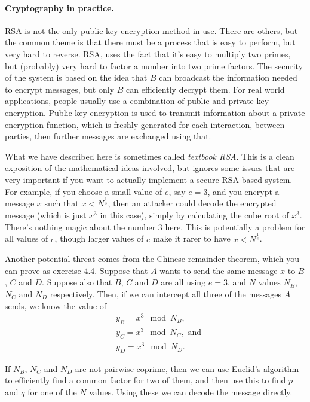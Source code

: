 \documentclass{article}
\theoremstyle{plain}
\begin{document}
\paragraph{Cryptography in practice.} 

RSA is not the only public key encryption method in use. There are others, but the common theme is that there must be a process that is easy to perform, but very hard to reverse. RSA, uses the fact that it's easy to multiply two primes, but (probably) very hard to factor a number into two prime factors. The security of the system is based on the idea that $B$ can broadcast the information needed to encrypt messages, but only $B$ can efficiently decrypt them. For real world applications, people usually use a combination of public and private key encryption. Public key encryption is used to transmit information about a private encryption function, which is freshly generated for each interaction, between parties, then further messages are exchanged using that.

What we have described here is sometimes called \emph{textbook RSA}. This is a clean exposition of the mathematical ideas involved, but ignores some issues that are very important if you want to actually implement a secure RSA based system. For example, if you choose a small value of $e$, say $e=3$, and you encrypt a message $x$ such that $x < N^{\frac{1}{3}}$, then an attacker could decode the encrypted message (which is just $x^3$ in this case), simply by calculating the cube root of $x^3$. There's nothing magic about the number $3$ here. This is potentially a problem for all values of $e$, though larger values of $e$ make it rarer to have $x < N^{\frac{1}{e}}$.

Another potential threat comes from the Chinese remainder theorem, which you can prove as exercise 4.4. Suppose that $A$ wants to send the same message $x$ to $B$, $C$ and $D$. Suppose also that $B$, $C$ and $D$ are all using $e = 3$, and $N$ values $N_B$, $N_C$ and $N_D$ respectively. Then, if we can intercept all three of the messages $A$ sends, we know the value of 
\begin{align*}
&y_B = x^3 \mod N_B,\\
&y_C = x^3 \mod N_C,\text{ and} \\ 
&y_D = x^3 \mod N_D. 
\end{align*} 

If $N_B$, $N_C$ and $N_D$ are not pairwise coprime, then we can use Euclid's algorithm to efficiently find a common factor for two of them, and then use this to find $p$ and $q$ for one of the $N$ values. Using these we can decode the message directly. 
\end{document}
